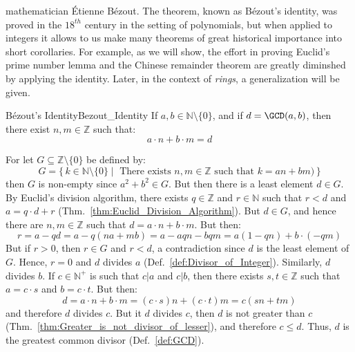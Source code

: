     mathematician \'{E}tienne B\'{e}zout. The theorem, known as
    B\'{e}zout's identity, was proved in the $18^{th}$ century in the
    setting of polynomials, but when applied to integers it allows to us
    make many theorems of great historical importance into short
    corollaries. For example, as we will show, the effort in proving
    Euclid's prime number lemma and the Chinese remainder theorem are
    greatly diminshed by applying the identity. Later, in the context of
    \textit{rings}, a generalization will be given.
    \begin{ftheorem}{B\'{e}zout's Identity}{Bezout_Identity}
        If $a,b\in\mathbb{N}\setminus\{0\}$, and if $d=\GCD(a,b)$, then
        there exist $n,m\in\mathbb{Z}$ such that:
        \begin{equation*}
            a\cdot{n}+b\cdot{m}=d
        \end{equation*}
    \end{ftheorem}
    \begin{bproof}
        For let $G\subseteq\mathbb{Z}\setminus\{0\}$ be defined by:
        \begin{equation}
            G=\{\,k\in\mathbb{N}\setminus\{0\}\;|\;
                \textrm{ There exists }n,m\in\mathbb{Z}
                \textrm{ such that }k=an+bm\big)\,\}
        \end{equation}
        then $G$ is non-empty since $a^{2}+b^{2}\in{G}$. But then there
        is a least element $d\in{G}$. By Euclid's division algorithm,
        there exists $q\in\mathbb{Z}$ and $r\in\mathbb{N}$ such that
        $r<d$ and $a=q\cdot{d}+r$
        (Thm.~\ref{thm:Euclid_Division_Algorithm}). But $d\in{G}$, and
        hence there are $n,m\in\mathbb{Z}$ such that
        $d=a\cdot{n}+b\cdot{m}$. But then:
        \begin{equation}
            r=a-qd=a-q(na+mb)=a-aqn-bqm=a(1-qn)+b\cdot(\minus{q}m)
        \end{equation}
        But if $r>0$, then $r\in{G}$ and $r<d$, a contradiction since
        $d$ is the least element of $G$. Hence, $r=0$ and $d$ divides
        $a$ (Def.~\ref{def:Divisor_of_Integer}). Similarly, $d$ divides
        $b$. If $c\in\mathbb{N}^{+}$ is such that $c|a$ and $c|b$, then
        there exists $s,t\in\mathbb{Z}$ such that $a=c\cdot{s}$ and
        $b=c\cdot{t}$. But then:
        \begin{equation}
            d=a\cdot{n}+b\cdot{m}=(c\cdot{s})n+(c\cdot{t})m=c(sn+tm)
        \end{equation}
        and therefore $d$ divides $c$. But it $d$ divides $c$, then
        $d$ is not greater than $c$
        (Thm.~\ref{thm:Greater_is_not_divisor_of_lesser}), and therefore
        $c\leq{d}$. Thus, $d$ is the greatest common divisor
        (Def.~\ref{def:GCD}).
    \end{bproof}
